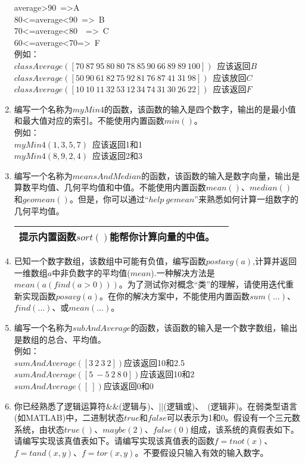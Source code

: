 \documentclass[UTF8]{ctexart}
\begin{document}
\begin{enumerate}
average>90\ =>\qquad A\\
80<=average<90\ =>\ B\\
70<=average<80\ \ =>\ C\\
60<=average<70\quad =>\ F\\
\text{\qquad} 例如：\\
\text{\qquad}$classAverage([70\ 87\ 95\ 80\ 80\ 78\ 85\ 90\ 66\ 89\ 89\ 100])$\ 应该返回$B$\\
\text{\qquad}$classAverage([50\ 90\ 61\ 82\ 75\ 92\ 81\ 76\ 87\ 41\ 31\ 98])$\ 应该放回$C$\\
\text{\qquad}$classAverage([10\ 10\ 11\ 32\ 53\ 12\ 34\ 74\ 31\ 30\ 26\ 22])$\ 	应该返回$F$
\item 编写一个名称为$myMin4$的函数，该函数的输入是四个数字，输出的是最小值和最大值对应的索引。不能使用内置函数$min()$。\\
\text{\qquad}例如：\\
\text{\qquad}$myMin4(1,3,5,7)$\ 应该返回1和1\\
\text{\qquad}$myMin4(8,9,2,4)$\ 应该返回2和3\\
\item 编写一个名称为$meansAndMedian$的函数，该函数的输入是数字向量，输出是算数平均值、几何平均值和中值。不能使用内置函数$mean()$、$median()$和$geomean()$。但是，你可以通过“$help\ gemean$”来熟悉如何计算一组数字的几何平均值。
\begin{table}[H]
	\centering
	\begin{tabular}{|p{10cm}|l|}
		\hline
		\textbf{提示}\qquad 内置函数$sort()$能帮你计算向量的中值。\\
		\hline
	\end{tabular}
\end{table}
\item 已知一个数字数组，该数组中可能有负值，编写函数$postavg(a)$,计算并返回一维数组$a$中非负数字的平均值($mean$).一种解决方法是$mean(a(find(a>0)))$。为了测试你对概念“类”的理解，请使用迭代重新实现函数$posavg(a)$。在你的解决方案中，不能使用内置函数$sum(\dots)$、$find(\dots)$、或$mean(\dots)$。
\item 编写一个名称为$subAndAverage$的函数，该函数的输入是一个数字数组，输出是数组的总合、平均值。\\
\text{\qquad}例如：\\
\text{\qquad}$sumAndAverage([3\ 2\ 3\ 2])$应该返回10和2.5\\
\text{\qquad}$sumAndAverage([5\ -5\ 2\ 8\ 0])$应该返回10和2\\
\text{\qquad}$sumAndAverage([\ ])$应该返回0和0
\item 你已经熟悉了逻辑运算符\&\&(逻辑与)、||(逻辑或)、~(逻辑非)。在弱类型语言(如MATLAB)中，二进制状态$true$和$false$可以表示为1和0。假设有一个三元数系统，由状态$true()$、$maybe(2)$、$false(0)$组成，该系统的真假表如下。请编写实现该真值表如下。请编写实现该真值表的函数$f=tnot(x)$、$f=tand(x,y)$、$f=tor(x,y)$。不要假设只输入有效的输入数字。

\end{enumerate}
\end{document}
